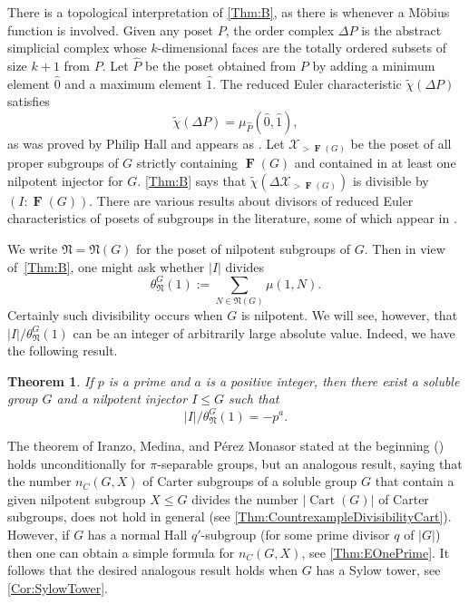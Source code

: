 \documentclass[10pt,a4paper]{amsart}
\numberwithin{equation}{section}
\DeclareMathOperator{\fitt}{\mathbf{F}}
\DeclareMathOperator{\cart}{Cart}
\newcommand{\card}[1]{\left\lvert{#1}\right\rvert}
\renewcommand{\leq}{\leqslant}
\def\NN{{\mathfrak N}}
\def\NS{\theta_\NN^G(1)}
\newtheorem{prevtheorem}{Theorem}
\begin{document}
  
There is a topological interpretation of \autoref{Thm:B}, 
as there is whenever a M\"obius function is involved. 
Given any poset $P$, 
the order complex $\Delta P$ is the abstract simplicial complex 
whose $k$-dimensional faces are the totally ordered subsets of size $k+1$ from $P$.  
Let $\hat{P}$ be the poset obtained from $P$ 
by adding a minimum element $\hat{0}$ and a maximum element $\hat{1}$.  
The reduced Euler characteristic $\tilde{\chi}(\Delta P)$ satisfies
\[
\tilde{\chi}(\Delta P) = \mu_{\hat{P}}(\hat{0}, \hat{1}),
\]
as was proved by Philip Hall and appears as \cite[Thm.~3.8.5]{StanleyEC1}.  
Let $\mathcal{X}_{>\fitt(G)}$ be the poset of all proper subgroups of $G$ 
strictly containing $\fitt(G)$ and contained in at least one nilpotent injector for $G$.  
\autoref{Thm:B} says that $\tilde{\chi}(\Delta\mathcal{X}_{>\fitt(G)})$ is divisible by $(I : \fitt(G))$.  There are various results about divisors of reduced Euler characteristics of posets of subgroups in the literature, some of which appear in \cite[Sections 5.3 and 5.4]{Smith}.

We write $\NN= \NN(G)$ for the poset of nilpotent subgroups of $G$. Then in view  of~\autoref{Thm:B}, one might ask whether $|I|$ divides 
$$
\NS:=\sum_{N \in \NN(G)}\mu(1,N).
$$  
Certainly such divisibility occurs when $G$ is nilpotent.  We will see, however, that $|I|/\NS$ can be an integer of arbitrarily large absolute value.  Indeed, we have the following result.

\begin{prevtheorem}\label{Thm:injectorratio}
If $p$ is a prime and $a$ is a positive integer, 
then there exist a soluble group $G$ 
and a nilpotent injector $I \leq G$ 
such that
\[
|I|/\NS=-p^a.
\]
\end{prevtheorem}





The theorem of Iranzo, Medina, and P\'{e}rez Monasor stated at the beginning (\cite[Theorem 0.1]{arithmetical_questions}) holds unconditionally for $\pi$-separable groups, but an analogous result, saying that the number $n_C(G,X)$ of Carter subgroups of a soluble group $G$ that contain a given nilpotent subgroup $X \leq G$ divides the number $\card{\cart(G)}$ of Carter subgroups, does not hold in general (see \autoref{Thm:CountrexampleDivisibilityCart}).  
However, if $G$ has a normal Hall $q'$-subgroup (for some prime divisor $q$ of $|G|$) then one can obtain a simple formula for $n_C(G,X)$, see \autoref{Thm:EOnePrime}.  It follows that the desired analogous result holds when $G$ has a Sylow tower, see \autoref{Cor:SylowTower}.  
\end{document}
